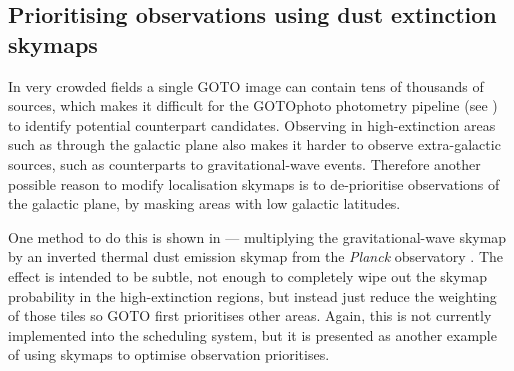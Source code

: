 \begin{colsection}
\subsection{Prioritising observations using dust extinction skymaps}
\label{sec:extinction_skymaps}
\begin{colsection}

In very crowded fields a single GOTO image can contain tens of thousands of sources, which makes it difficult for the GOTOphoto photometry pipeline (see ) to identify potential counterpart candidates. Observing in high-extinction areas such as through the galactic plane also makes it harder to observe extra-galactic sources, such as counterparts to gravitational-wave events. Therefore another possible reason to modify localisation skymaps is to de-prioritise observations of the galactic plane, by masking areas with low galactic latitudes.

One method to do this is shown in  --- multiplying the gravitational-wave skymap by an inverted thermal dust emission skymap from the \textit{Planck} observatory \citep{Planck_dust}. The effect is intended to be subtle, not enough to completely wipe out the skymap probability in the high-extinction regions, but instead just reduce the weighting of those tiles so GOTO first prioritises other areas. Again, this is not currently implemented into the scheduling system, but it is presented as another example of using skymaps to optimise observation prioritises.


\end{colsection}
\end{colsection}
